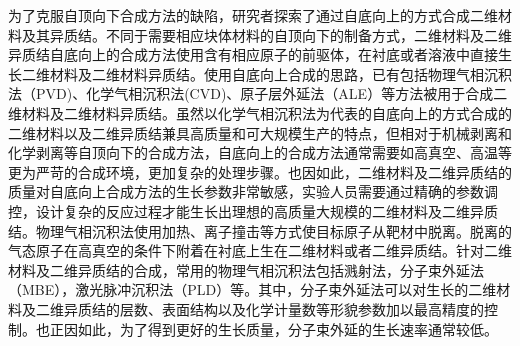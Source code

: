 为了克服自顶向下合成方法的缺陷，研究者探索了通过自底向上的方式合成二维材料及其异质结。不同于需要相应块体材料的自顶向下的制备方式，二维材料及二维异质结自底向上的合成方法使用含有相应原子的前驱体，在衬底或者溶液中直接生长二维材料及二维材料异质结。使用自底向上合成的思路，已有包括物理气相沉积法（PVD)、化学气相沉积法(CVD)、原子层外延法（ALE）等方法被用于合成二维材料及二维材料异质结。虽然以化学气相沉积法为代表的自底向上的方式合成的二维材料以及二维异质结兼具高质量和可大规模生产的特点，但相对于机械剥离和化学剥离等自顶向下的合成方法，自底向上的合成方法通常需要如高真空、高温等更为严苛的合成环境，更加复杂的处理步骤。也因如此，二维材料及二维异质结的质量对自底向上合成方法的生长参数非常敏感，实验人员需要通过精确的参数调控，设计复杂的反应过程才能生长出理想的高质量大规模的二维材料及二维异质结。物理气相沉积法使用加热、离子撞击等方式使目标原子从靶材中脱离。脱离的气态原子在高真空的条件下附着在衬底上生在二维材料或者二维异质结。针对二维材料及二维异质结的合成，常用的物理气相沉积法包括溅射法，分子束外延法（MBE），激光脉冲沉积法（PLD）等。其中，分子束外延法可以对生长的二维材料及二维异质结的层数、表面结构以及化学计量数等形貌参数加以最高精度的控制。也正因如此，为了得到更好的生长质量，分子束外延的生长速率通常较低。




